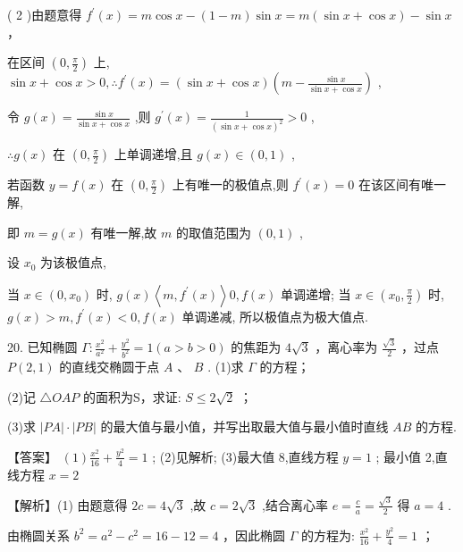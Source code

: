 \documentclass[10pt]{article}
\begin{document}
( 2 )由题意得 \({f}^{\prime }\left( x\right)  = m\cos x - \left( {1 - m}\right) \sin x = m\left( {\sin x + \cos x}\right)  - \sin x\) ，

在区间 \(\left( {0,\frac{\pi }{2}}\right)\) 上, \(\sin x + \cos x > 0,\therefore {f}^{\prime }\left( x\right)  = \left( {\sin x + \cos x}\right) \left( {m - \frac{\sin x}{\sin x + \cos x}}\right)\) ,

令 \(g\left( x\right)  = \frac{\sin x}{\sin x + \cos x}\) ,则 \({g}^{\prime }\left( x\right)  = \frac{1}{{\left( \sin x + \cos x\right) }^{2}} > 0\) ,

\(\therefore g\left( x\right)\) 在 \(\left( {0,\frac{\pi }{2}}\right)\) 上单调递增,且 \(g\left( x\right)  \in  \left( {0,1}\right)\) ,

若函数 \(y = f\left( x\right)\) 在 \(\left( {0,\frac{\pi }{2}}\right)\) 上有唯一的极值点,则 \({f}^{\prime }\left( x\right)  = 0\) 在该区间有唯一解,

即 \(m = g\left( x\right)\) 有唯一解,故 \(m\) 的取值范围为 \(\left( {0,1}\right)\) ,

设 \({x}_{0}\) 为该极值点,

当 \(x \in  \left( {0,{x}_{0}}\right)\) 时, \(g\left( x\right) \left\langle  {m,{f}^{\prime }\left( x\right) }\right\rangle  0,f\left( x\right)\) 单调递增; 当 \(x \in  \left( {{x}_{0},\frac{\pi }{2}}\right)\) 时, \(g\left( x\right)  > m,{f}^{\prime }\left( x\right)  < 0,f\left( x\right)\) 单调递减, 所以极值点为极大值点.

20. 已知椭圆 \(\Gamma  : \frac{{x}^{2}}{{a}^{2}} + \frac{{y}^{2}}{{b}^{2}} = 1\left( {a > b > 0}\right)\) 的焦距为 \(4\sqrt{3}\) ，离心率为 \(\frac{\sqrt{3}}{2}\) ，过点 \(P\left( {2,1}\right)\) 的直线交椭圆于点 \(A\) 、 \(B\) . (1)求 \(\Gamma\) 的方程；

(2)记 \(\bigtriangleup  {OAP}\) 的面积为S，求证: \(S \leq  2\sqrt{2}\) ；

(3)求 \(\left| {PA}\right|  \cdot  \left| {PB}\right|\) 的最大值与最小值，并写出取最大值与最小值时直线 \({AB}\) 的方程.

【答案】 \(\left( 1\right) \frac{{x}^{2}}{16} + \frac{{y}^{2}}{4} = 1\) ; (2)见解析; (3)最大值 8,直线方程 \(y = 1\) ; 最小值 2,直线方程 \(x = 2\)

【解析】(1) 由题意得 \({2c} = 4\sqrt{3}\) ,故 \(c = 2\sqrt{3}\) ,结合离心率 \(e = \frac{c}{a} = \frac{\sqrt{3}}{2}\) 得 \(a = 4\) .

由椭圆关系 \({b}^{2} = {a}^{2} - {c}^{2} = {16} - {12} = 4\) ，因此椭圆 \(\Gamma\) 的方程为: \(\frac{{x}^{2}}{16} + \frac{{y}^{2}}{4} = 1\) ；
\end{document}
